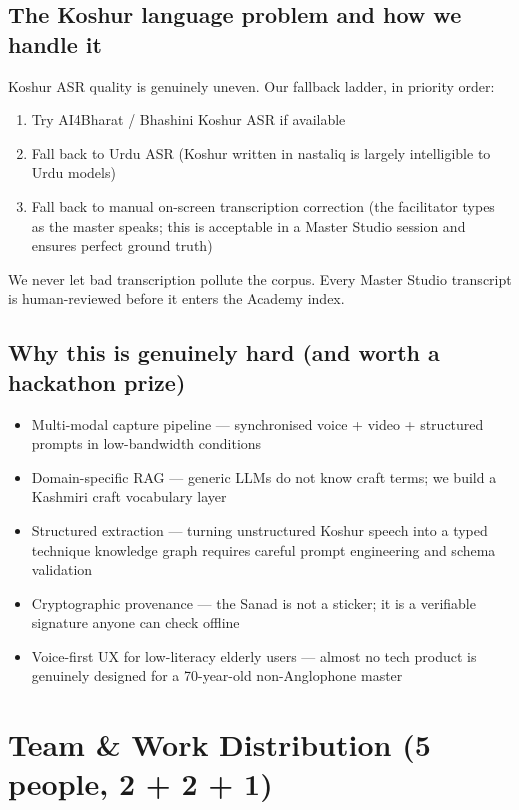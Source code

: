 \documentclass[11pt, a4paper]{article}
\begin{document}
\subsection{The Koshur language problem and how we handle it}

Koshur ASR quality is genuinely uneven. Our fallback ladder, in priority order:

\begin{enumerate}
  \item Try AI4Bharat / Bhashini Koshur ASR if available
  \item Fall back to Urdu ASR (Koshur written in nastaliq is largely intelligible to Urdu models)
  \item Fall back to manual on-screen transcription correction (the facilitator types as the master speaks; this is acceptable in a Master Studio session and ensures perfect ground truth)
\end{enumerate}

We never let bad transcription pollute the corpus. Every Master Studio transcript is human-reviewed before it enters the Academy index.

\subsection{Why this is genuinely hard (and worth a hackathon prize)}

\begin{itemize}
  \item Multi-modal capture pipeline — synchronised voice + video + structured prompts in low-bandwidth conditions
  \item Domain-specific RAG — generic LLMs do not know craft terms; we build a Kashmiri craft vocabulary layer
  \item Structured extraction — turning unstructured Koshur speech into a typed technique knowledge graph requires careful prompt engineering and schema validation
  \item Cryptographic provenance — the Sanad is not a sticker; it is a verifiable signature anyone can check offline
  \item Voice-first UX for low-literacy elderly users — almost no tech product is genuinely designed for a 70-year-old non-Anglophone master
\end{itemize}

\section{Team \& Work Distribution (5 people, 2 + 2 + 1)}
\end{document}
